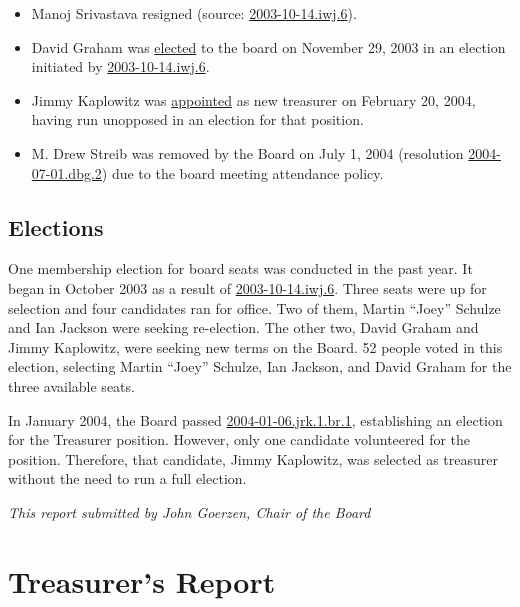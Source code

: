 \documentclass[letterpaper]{report}
\begin{document}
\begin{itemize}
\item Manoj Srivastava resigned (source: \href{https://www.spi-inc.org/corporate/resolutions/2003/2003-10-14.iwj.6}{2003-10-14.iwj.6}).
\item David Graham was \href{http://lists.spi-inc.org/pipermail/spi-announce/2003/000065.html}{elected}
to the board on November 29, 2003 in an election initiated by \href{https://www.spi-inc.org/corporate/resolutions/2003/2003-10-14.iwj.6}{2003-10-14.iwj.6}.
\item Jimmy Kaplowitz was \href{http://lists.spi-inc.org/pipermail/spi-announce/2004/000070.html}{appointed}
as new treasurer on February 20, 2004, having run unopposed in an
election for that position.
\item M. Drew Streib was removed by the Board on July 1, 2004 (resolution
\href{http://lists.spi-inc.org/pipermail/spi-announce/2004/000083.html}{2004-07-01.dbg.2})
due to the board meeting attendance policy.
\end{itemize}

\section{Elections}

One membership election for board seats was conducted in the past
year. It began in October 2003 as a result of \href{http://lists.spi-inc.org/pipermail/spi-announce/2003/000057.html}{2003-10-14.iwj.6}.
Three seats were up for selection and four candidates ran for office.
Two of them, Martin ``Joey'' Schulze and Ian Jackson were seeking
re-election. The other two, David Graham and Jimmy Kaplowitz, were
seeking new terms on the Board. 52 people voted in this election,
selecting Martin ``Joey'' Schulze, Ian Jackson, and David Graham
for the three available seats.

In January 2004, the Board passed \href{http://lists.spi-inc.org/pipermail/spi-announce/2004/000069.html}{2004-01-06.jrk.1.br.1},
establishing an election for the Treasurer position. However, only
one candidate volunteered for the position. Therefore, that candidate,
Jimmy Kaplowitz, was selected as treasurer without the need to run
a full election.

\emph{This report submitted by John Goerzen, Chair of the Board}


\chapter{Treasurer's Report}
\end{document}
